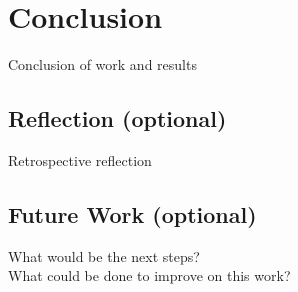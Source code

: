 \chapter{Conclusion} \label{chapter:Conclusion}
Conclusion of work and results
\section{Reflection (optional)}
Retrospective reflection
\section{Future Work (optional)}
What would be the next steps? \\
What could be done to improve on this work?

